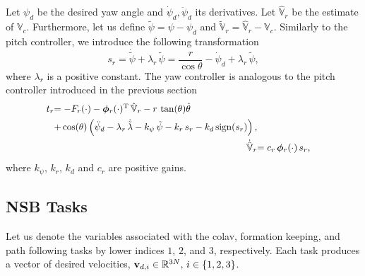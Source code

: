 Let $\psi_d$ be the desired yaw angle and $\dot{\psi}_d, \ddot{\psi}_d$ its derivatives.
Let $\hat{\mathbb{V}}_r$ be the estimate of $\mathbb{V}_c$.
Furthermore, let us define $\tilde{\psi} = \psi - \psi_d$ and $\tilde{\mathbb{V}}_r = \hat{\mathbb{V}}_r - \mathbb{V}_c$.
Similarly to the pitch controller, we introduce the following transformation
\begin{equation}
    s_r = \dot{\tilde{\psi}} + \lambda_r\,\tilde{\psi} = \frac{r}{\cos\theta} - \dot{\psi}_d + \lambda_r\,\tilde{\psi},
\end{equation}
where $\lambda_r$ is a positive constant.
The yaw controller is analogous to the pitch controller introduced in the previous section
\begin{align}        
    \begin{split}
        \scale[0.95]{t_r} &\scale[0.95]{= - F_r(\cdot) - \bs{\phi}_r(\cdot)\T\,\hat{\mathbb{V}}_r - r\,\tan(\theta)\dot{\theta}} \\
        & \scale[0.95]{ + \cos(\theta)\left(\ddot{\psi}_d - \lambda_r\,\dot{\tilde{\lambda}} - k_{\psi}\,\tilde{\psi} - k_r\,s_r - k_d\,{\rm sign}(s_r)\right), }
    \end{split} \label{eq:nsb_5dof_t_r} \\
    \scale[0.95]{\dot{\hat{\mathbb{V}}}_r} & \scale[0.95]{= c_r\,\bs{\phi}_r(\cdot)\,s_r,} \label{eq:nsb_5dof_V_hat_r}
\end{align}
where $k_{\psi}$, $k_r$, $k_d$ and $c_r$ are positive gains.

\subsection{NSB Tasks}
\label{sec:nsb_5dof_NSB}
Let us denote the variables associated with the \gls{colav}, formation keeping, and path following tasks by lower indices $1$, $2$, and $3$, respectively.
Each task produces a vector of desired velocities, $\mathbf{v}_{d,i} \in \mathbb{R}^{3N},\, i\in\{1,2,3\}$.

